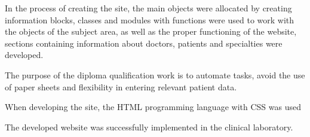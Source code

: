 In the process of creating the site, the main objects were allocated by creating information blocks, classes and modules with functions were used to work with the objects of the subject area, as well as the proper functioning of the website, sections containing information about doctors, patients and specialties were developed.

The purpose of the diploma qualification work is to automate tasks, avoid the use of paper sheets and flexibility in entering relevant patient data.

When developing the site, the HTML programming language with CSS was used

The developed website was successfully implemented in the clinical laboratory.
